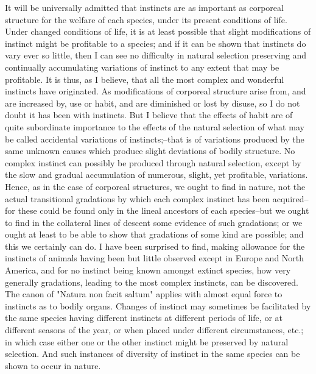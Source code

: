It will be universally admitted that instincts are as important as corporeal structure for the welfare of each species, under its present conditions of life. Under changed conditions of life, it is at least possible that slight modifications of instinct might be profitable to a species; and if it can be shown that instincts do vary ever so little, then I can see no difficulty in natural selection preserving and continually accumulating variations of instinct to any extent that may be profitable. It is thus, as I believe, that all the most complex and wonderful instincts have originated. As modifications of corporeal structure arise from, and are increased by, use or habit, and are diminished or lost by disuse, so I do not doubt it has been with instincts. But I believe that the effects of habit are of quite subordinate importance to the effects of the natural selection of what may be called accidental variations of instincts;--that is of variations produced by the same unknown causes which produce slight deviations of bodily structure.
No complex instinct can possibly be produced through natural selection, except by the slow and gradual accumulation of numerous, slight, yet profitable, variations. Hence, as in the case of corporeal structures, we ought to find in nature, not the actual transitional gradations by which each complex instinct has been acquired--for these could be found only in the lineal ancestors of each species--but we ought to find in the collateral lines of descent some evidence of such gradations; or we ought at least to be able to show that gradations of some kind are possible; and this we certainly can do. I have been surprised to find, making allowance for the instincts of animals having been but little observed except in Europe and North America, and for no instinct being known amongst extinct species, how very generally gradations, leading to the most complex instincts, can be discovered. The canon of "Natura non facit saltum" applies with almost equal force to instincts as to bodily organs. Changes of instinct may sometimes be facilitated by the same species having different instincts at different periods of life, or at different seasons of the year, or when placed under different circumstances, etc.; in which case either one or the other instinct might be preserved by natural selection. And such instances of diversity of instinct in the same species can be shown to occur in nature.
